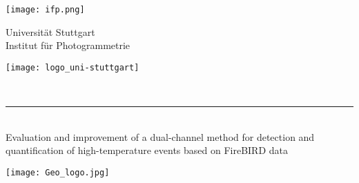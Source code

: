 \documentclass[
12pt, %
english, %
singlespacing, %
headsepline, %
]{MastersThesis} %
\author{Penghua \textsc{Li}} %
\begin{document}
\frontmatter %

\pagestyle{plain} %




\begin{titlepage}

\begin{minipage}[c][\textheight][t]{\textwidth}
  \centering
  \begin{minipage}[c]{2cm}%
    \texttt{[image: ifp.png]}%
  \end{minipage}
  \hfill
  \begin{minipage}[c]{8cm}
    \centering
    \vspace*{2mm}
    \LARGE Universität Stuttgart \\[3mm]
    \Large Institut für Photogrammetrie
  \end{minipage}
  \hfill
  \begin{minipage}[c]{2cm}%
    \texttt{[image: logo\_uni-stuttgart]}%
  \end{minipage}\\[5mm]
  \rule{\textwidth}{0.5pt}\\[10mm]

  \vspace*{1cm} %
  {\LARGE {Evaluation and improvement of a dual-channel method for detection and quantification of high-temperature events based on FireBIRD data}}\\
  \vspace*{1cm} %

  \texttt{[image: Geo\_logo.jpg]}\\[10mm] %

  \vfill


\end{minipage}
\end{titlepage}
\end{document}
